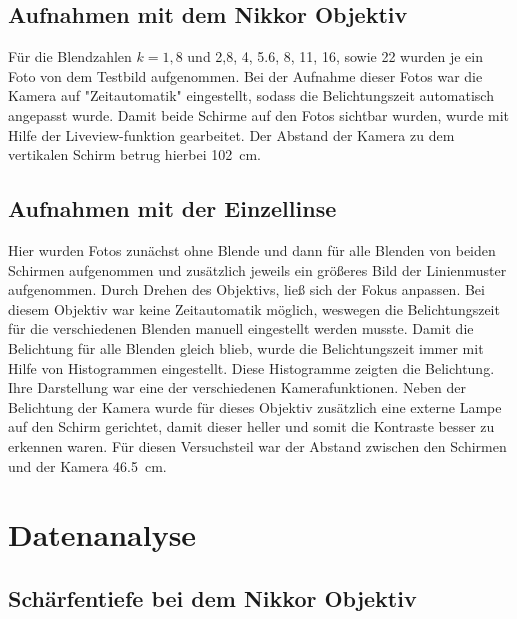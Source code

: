 	\subsection{Aufnahmen mit dem Nikkor Objektiv}
		
		Für die Blendzahlen $k=1,8$ und 2,8, 4, 5.6, 8, 11, 16, sowie 22 wurden je ein Foto von dem Testbild aufgenommen.
		Bei der Aufnahme dieser Fotos war die Kamera auf "Zeitautomatik" eingestellt, sodass die Belichtungszeit automatisch angepasst wurde.
		Damit beide Schirme auf den Fotos sichtbar wurden, wurde mit Hilfe der Liveview-funktion gearbeitet.
		Der Abstand der Kamera zu dem vertikalen Schirm betrug hierbei \SI{102}{\centi\meter}. %
		
	\subsection{Aufnahmen mit der Einzellinse}
	
		Hier wurden Fotos zunächst ohne Blende und dann für alle Blenden von beiden Schirmen aufgenommen und zusätzlich jeweils ein größeres Bild der Linienmuster aufgenommen.
		Durch Drehen des Objektivs, ließ sich der Fokus anpassen.
		Bei diesem Objektiv war keine Zeitautomatik möglich, weswegen die Belichtungszeit für die verschiedenen Blenden manuell eingestellt werden musste.
		Damit die Belichtung für alle Blenden gleich blieb, wurde die Belichtungszeit immer mit Hilfe von Histogrammen eingestellt.
		Diese Histogramme zeigten die Belichtung.
		Ihre Darstellung war eine der verschiedenen Kamerafunktionen.
		Neben der Belichtung der Kamera wurde für dieses Objektiv zusätzlich eine externe Lampe auf den Schirm gerichtet, damit dieser heller und somit die Kontraste besser zu erkennen waren. 
		Für diesen Versuchsteil war der Abstand zwischen den Schirmen und der Kamera \SI{46,5}{\centi\meter}. %
		
\section{Datenanalyse} \label{sec:Analyse}
	
	\subsection{Schärfentiefe bei dem Nikkor Objektiv}
	
		
